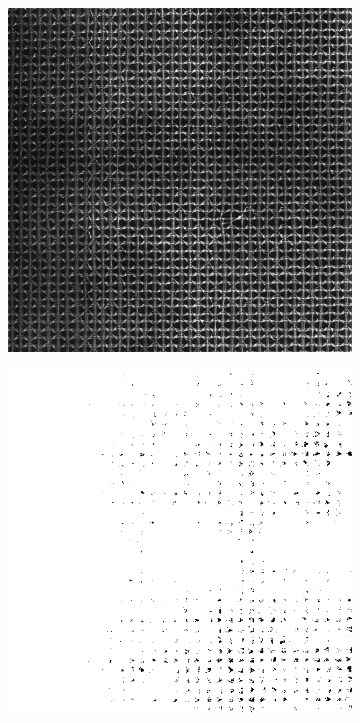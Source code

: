 \begin{figure}
    \centering
    \begin{subfigure}[b]{.25\textwidth}
        \centering
        \includegraphics[width=\textwidth]{contenu/resources/images/lattice}
    \end{subfigure}
    \hspace{1em}
    \begin{subfigure}[b]{.25\textwidth}
        \centering
        \includegraphics[width=\textwidth]{contenu/resources/images/lattice_filtered}

\end{subfigure}
\end{figure}
